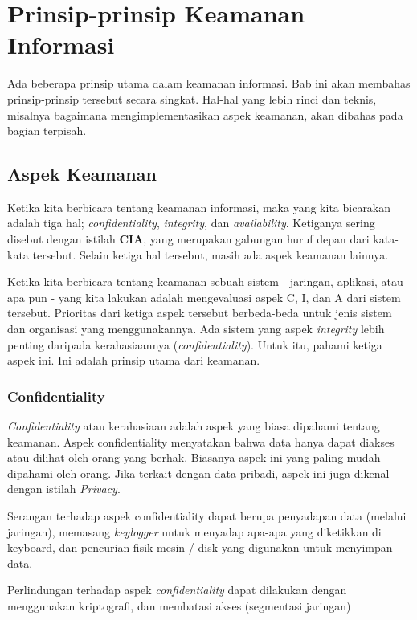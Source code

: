 \chapter{Prinsip-prinsip Keamanan Informasi}

Ada beberapa prinsip utama dalam keamanan informasi.
Bab ini akan membahas prinsip-prinsip tersebut secara singkat.
Hal-hal yang lebih rinci dan teknis, misalnya bagaimana mengimplementasikan
aspek keamanan, akan dibahas pada bagian terpisah.


\section{Aspek Keamanan}
Ketika kita berbicara tentang keamanan informasi, maka yang kita
bicarakan adalah tiga hal;
{\em confidentiality}, {\em integrity}, dan {\em availability}.
Ketiganya sering disebut dengan istilah \textbf{CIA},
yang merupakan gabungan huruf depan dari kata-kata tersebut.
Selain ketiga hal tersebut, masih ada aspek keamanan lainnya.

Ketika kita berbicara tentang keamanan sebuah sistem - jaringan, aplikasi,
atau apa pun - yang kita lakukan adalah mengevaluasi aspek C, I, dan A
dari sistem tersebut.
Prioritas dari ketiga aspek tersebut berbeda-beda untuk jenis sistem
dan organisasi yang menggunakannya. Ada sistem yang aspek {\em integrity}
lebih penting daripada kerahasiaannya ({\em confidentiality}).
Untuk itu, pahami ketiga aspek ini. 
Ini adalah prinsip utama dari keamanan.

\subsection{Confidentiality}
{\em Confidentiality} atau kerahasiaan adalah aspek yang biasa dipahami
tentang keamanan.
Aspek confidentiality menyatakan bahwa data hanya dapat diakses
atau dilihat oleh orang yang berhak.
Biasanya aspek ini yang paling mudah dipahami oleh orang.
Jika terkait dengan data pribadi, aspek ini juga dikenal dengan
istilah {\em Privacy}.

Serangan terhadap aspek confidentiality dapat berupa
penyadapan data (melalui jaringan),
memasang {\em keylogger} untuk menyadap apa-apa yang diketikkan
di keyboard,
dan pencurian fisik mesin / disk yang digunakan untuk menyimpan data.

Perlindungan terhadap aspek {\em confidentiality} dapat dilakukan
dengan menggunakan kriptografi, 
dan membatasi akses (segmentasi jaringan)


